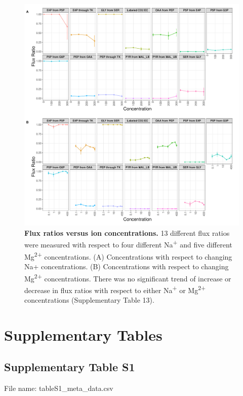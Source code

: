 \documentclass[a4paper]{article}
\begin{document}
\clearpage
\begin{figure}[!htb]
	\includegraphics[width=1\textwidth]{../../e_figures/Exp.pdf}
	\caption[Flux ratios versus ion concentrations]
	{\textbf{Flux ratios versus ion concentrations.} 13 different flux ratios were measured with respect to four different Na\textsuperscript{+} and five different Mg\textsuperscript{2+} concentrations. (A) Concentrations with respect to changing Na+ concentrations. (B) Concentrations with respect to changing Mg\textsuperscript{2+} concentrations. There was no significant trend of increase or decrease in flux ratios with respect to either Na\textsuperscript{+} or Mg\textsuperscript{2+} concentrations (Supplementary Table 13).}
\end{figure}




\clearpage

\section*{Supplementary Tables}

\subsection*{Supplementary Table S1}
File name: tableS1\_meta\_data.csv
\end{document}
